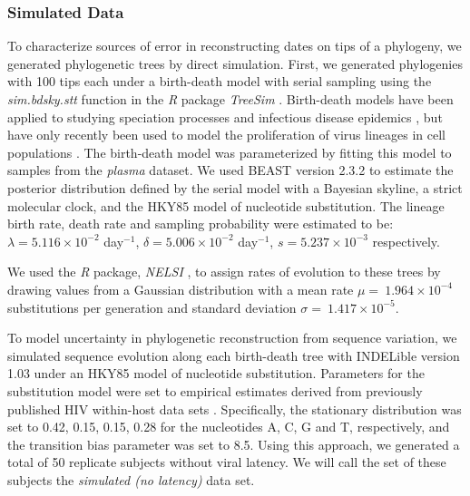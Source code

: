 \documentclass[12pt]{article}
\begin{document}
\subsubsection * {Simulated Data} \label{subsec:simdata}


To characterize sources of error in reconstructing dates on tips of a phylogeny, we generated phylogenetic trees by direct simulation. %
First, we generated phylogenies with 100 tips each under a birth-death model with serial sampling using the \emph{sim.bdsky.stt} function in the \textit{R} package \textit{TreeSim} \citep{Boskova14}.
Birth-death models have been applied to studying speciation processes \citep{Nee:2006} and infectious disease epidemics \citep{Stradler13}, but have only recently been used to model the proliferation of virus lineages in cell populations \citep{Hartfield:2015}.
The birth-death model was parameterized by fitting this model to samples from the {\em plasma} dataset.
We used BEAST version 2.3.2 to estimate the posterior distribution defined by the serial model with a Bayesian skyline, a strict molecular clock, and the HKY85 \citep{HKY85} model of nucleotide substitution.
The lineage birth rate, death rate and sampling probability were estimated to be: $\lambda = 5.116 \times 10^{-2}$ day$^{-1}$, $\delta = 5.006 \times 10^{-2}$ day$^{-1}$, $s = 5.237 \times 10^{-3}$ respectively.

We used the \textit{R} package, \emph{NELSI} \citep{NELSI}, to assign rates of evolution to these trees by drawing values from a Gaussian distribution with a mean rate $\mu = \ 1.964\times 10^{-4}$ substitutions per generation and standard deviation $\sigma = \ 1.417\times 10^{-5}$. %

To model uncertainty in phylogenetic reconstruction from sequence variation, we simulated sequence evolution along each birth-death tree with INDELible version 1.03 \citep{Indelible09} under an HKY85 \citep{HKY85} model of nucleotide substitution.
Parameters for the substitution model were set to empirical estimates derived from previously published HIV within-host data sets \citep{McCloskey14}. 
Specifically, the stationary distribution was set to 0.42, 0.15, 0.15, 0.28 for the nucleotides A, C, G and T, respectively, and the transition bias parameter was set to 8.5.
Using this approach, we generated a total of 50 replicate subjects without viral latency.
We will call the set of these subjects the \emph{simulated (no latency)} data set.
\end{document}
